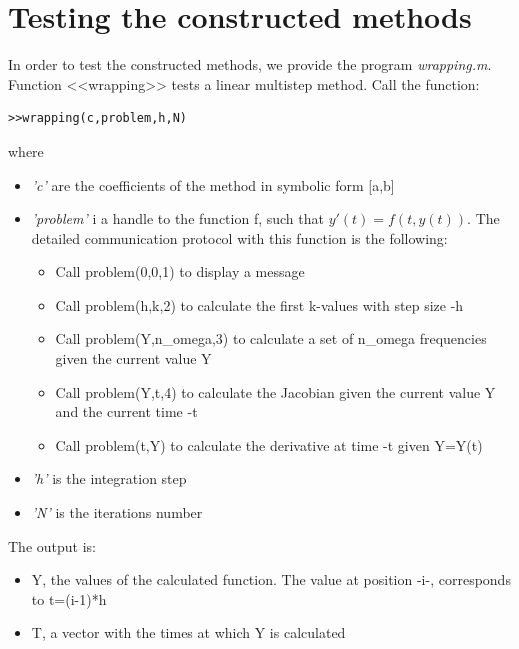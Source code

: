 \documentclass[acmtoms,acmnow]{acmtrans2m}
\begin{document}
\section{Testing the constructed methods}
In order to test the constructed methods, we provide the program \textit{wrapping.m}. Function <<wrapping>> tests a linear multistep method. Call the function:
\begin{verbatim}
>>wrapping(c,problem,h,N)
\end{verbatim}
where
\begin{itemize}
 \item \textit{'c'} are the coefficients of the method in symbolic form [a,b] 
\item \textit{'problem'} i a handle to the function f, such that $y'(t)=f(t,y(t))$. The detailed communication protocol with this function is the following:
\begin{itemize}
\item Call problem(0,0,1) to display a message
\item Call problem(h,k,2) to calculate the first k-values with step size -h
\item Call problem(Y,n\_omega,3) to calculate a set of n\_omega frequencies given the current value Y
\item Call problem(Y,t,4) to calculate the Jacobian given the current value Y and the current time -t
\item Call problem(t,Y) to calculate the derivative at time -t given Y=Y(t)
\end{itemize}
\item \textit{'h'} is the integration step
\item \textit{'N'} is the iterations number
\end{itemize}
The output is:
\begin{itemize}
 \item Y, the values of the calculated function. The value at position -i-, corresponds to t=(i-1)*h
\item T, a vector with the times at which Y is calculated
\end{itemize}
\end{document}
